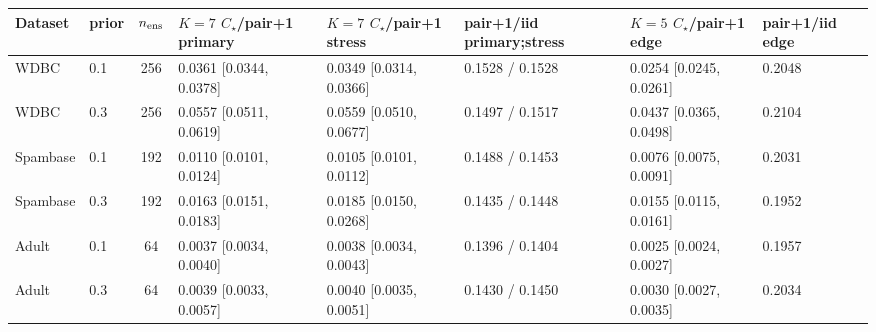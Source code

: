 \begin{tabular}{llclllll}
\toprule
Dataset & prior & $n_{\rm ens}$ & $K=7$ $C_\star$/pair+1 primary & $K=7$ $C_\star$/pair+1 stress & pair+1/iid primary;stress & $K=5$ $C_\star$/pair+1 edge & pair+1/iid edge \\
\midrule
WDBC & 0.1 & 256 & 0.0361 [0.0344, 0.0378] & 0.0349 [0.0314, 0.0366] & 0.1528 / 0.1528 & 0.0254 [0.0245, 0.0261] & 0.2048 \\
WDBC & 0.3 & 256 & 0.0557 [0.0511, 0.0619] & 0.0559 [0.0510, 0.0677] & 0.1497 / 0.1517 & 0.0437 [0.0365, 0.0498] & 0.2104 \\
Spambase & 0.1 & 192 & 0.0110 [0.0101, 0.0124] & 0.0105 [0.0101, 0.0112] & 0.1488 / 0.1453 & 0.0076 [0.0075, 0.0091] & 0.2031 \\
Spambase & 0.3 & 192 & 0.0163 [0.0151, 0.0183] & 0.0185 [0.0150, 0.0268] & 0.1435 / 0.1448 & 0.0155 [0.0115, 0.0161] & 0.1952 \\
Adult & 0.1 & 64 & 0.0037 [0.0034, 0.0040] & 0.0038 [0.0034, 0.0043] & 0.1396 / 0.1404 & 0.0025 [0.0024, 0.0027] & 0.1957 \\
Adult & 0.3 & 64 & 0.0039 [0.0033, 0.0057] & 0.0040 [0.0035, 0.0051] & 0.1430 / 0.1450 & 0.0030 [0.0027, 0.0035] & 0.2034 \\
\bottomrule
\end{tabular}
